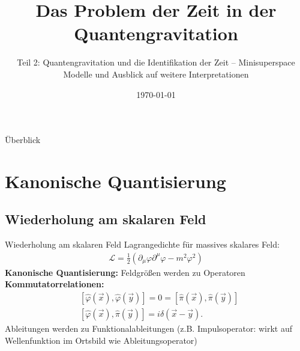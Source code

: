 \documentclass[mathserif]{beamer}
\title{\textbf{Das Problem der Zeit in der Quantengravitation}}
\author{\small {Teil 2: Quantengravitation und die Identifikation der Zeit -- Minisuperspace Modelle und Ausblick auf weitere Interpretationen}}
\institute{}
\date{\today}
\theoremstyle{definition}
\begin{document}
	\begin{frame}
		\titlepage
	\end{frame}

	\begin{frame}{Überblick}
		\tableofcontents
	\end{frame}

\section{Kanonische Quantisierung}
\subsection{Wiederholung am skalaren Feld}
	\begin{frame}{Wiederholung am skalaren Feld}
		Lagrangedichte für massives skalares Feld:
		\begin{align}
			\mathcal{L}=\frac{1}{2}(\partial_\mu\varphi \partial^\mu\varphi-m^2\varphi^2)
		\end{align}
		\pause
		\textbf{Kanonische Quantisierung:} Feldgrößen werden zu Operatoren\\
		\pause
		\textbf{Kommutatorrelationen:}
		\begin{align}
			&[\hat{\varphi}(\vec{x}), \hat{\varphi}(\vec{y})]=0=[\hat{\pi}(\vec{x}), \hat{\pi}(\vec{y})] \\
			&[\hat{\varphi}(\vec{x}), \hat{\pi}(\vec{y})]=i\delta(\vec{x}-\vec{y}).
		\end{align}
		Ableitungen werden zu Funktionalableitungen (z.B. Impulsoperator: wirkt auf Wellenfunktion im Ortsbild wie Ableitungsoperator)
	\end{frame}
\end{document}
